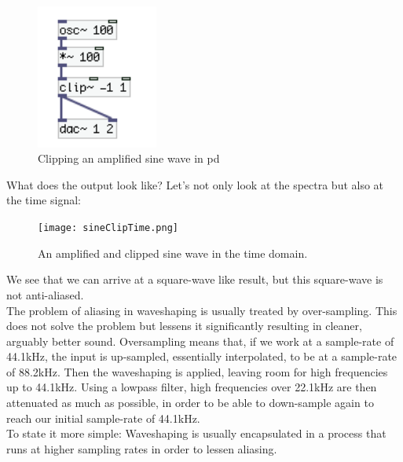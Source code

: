 \begin{figure}[H]
	\begin{center}
		\includegraphics[width = 4cm]{img/pdSineClipping.png}
		\caption{Clipping an amplified sine wave in pd}
		\label{fig:pdClipping}
	\end{center}
\end{figure}

What does the output look like? Let's not only look at the spectra but also at the time signal:


\begin{figure}[H]
	\begin{center}
		\texttt{[image: sineClipTime.png]}
		\caption{An amplified and clipped sine wave in the time domain.}
		\label{fig:timeClip}
	\end{center}
\end{figure}

We see that we can arrive at a square-wave like result, but this square-wave is not anti-aliased.\\

The problem of aliasing in waveshaping is usually treated by over-sampling. This does not solve the problem but lessens it significantly resulting in cleaner, arguably better sound. Oversampling means that, if we work at a sample-rate of 44.1kHz, the input is up-sampled, essentially interpolated, to be at a sample-rate of 88.2kHz. Then the waveshaping is applied, leaving room for high frequencies up to 44.1kHz. Using a lowpass filter, high frequencies over 22.1kHz are then attenuated as much as possible, in order to be able to down-sample again to reach our initial sample-rate of 44.1kHz. \\
To state it more simple: Waveshaping is usually encapsulated in a process that runs at higher sampling rates in order to lessen aliasing. 





